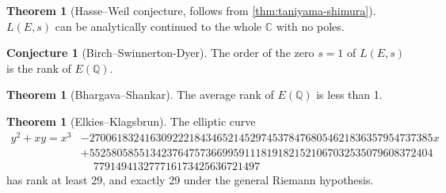 \documentclass{article}
\newcommand{\Q}{\mathbb{Q}}
\newcommand{\C}{\mathbb{C}}
\theoremstyle{definition}
\newtheorem{thm}[defn]{Theorem}
\newtheorem{conj}[defn]{Conjecture}
\begin{document}
\begin{thm}[Hasse--Weil conjecture, follows from \ref{thm:taniyama-shimura}]
$L(E,s)$ can be analytically continued to the whole $\C$ with no poles.
\end{thm}

\begin{conj}[Birch--Swinnerton-Dyer]
The order of the zero $s=1$ of $L(E,s)$ is the rank of $E(\Q)$.
\end{conj}

\begin{thm}[Bhargava--Shankar]
The average rank of $E(\Q)$ is less than 1.
\end{thm}

\begin{thm}[Elkies--Klagsbrun]
The elliptic curve
\[
\begin{aligned}
y^2+xy=x^3&-27006183241630922218434652145297453784768054621836357954737385x\\&+55258058551342376475736699591118191821521067032535079608372404\\&\quad \, 779149413277716173425636721497
\end{aligned}
\]
has rank at least 29, and exactly 29 under the general Riemann hypothesis.
\end{thm}
\end{document}
